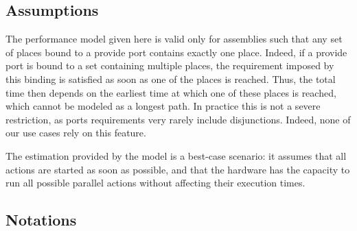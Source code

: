 \subsection{Assumptions}

The performance model given here is valid only for assemblies such that any set of places bound to a provide port contains exactly one place. Indeed, if a provide port is bound to a set containing multiple places, the requirement imposed by this binding is satisfied as soon as one of the places is reached. Thus, the total time then depends on the earliest time at which one of these places is reached, which cannot be modeled as a longest path. In practice this is not a severe restriction, as ports requirements very rarely include disjunctions. Indeed, none of our use cases rely on this feature. %


The estimation provided by the model is a best-case scenario: it assumes that all actions are started as soon as possible, and that the hardware has the capacity to run all possible parallel actions without affecting their execution times.

\subsection{Notations}


